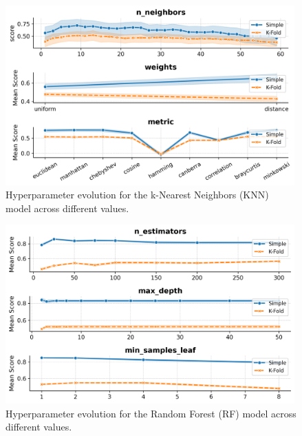 \begin{figure}
	\begin{center}
		\includegraphics[width=0.99\textwidth]{../images/models/knn_hyperparameters_evolution.png}
	\end{center}
	\caption{Hyperparameter evolution for the k-Nearest Neighbors (KNN) model
		across different values.}
	\label{fig:figA11}
\end{figure}

\begin{figure}
	\begin{center}
		\includegraphics[width=0.99\textwidth]{../images/models/rf_hyperparameters_evolution.png}
	\end{center}
	\caption{Hyperparameter evolution for the Random Forest (RF) model across
		different values.}
\end{figure}

